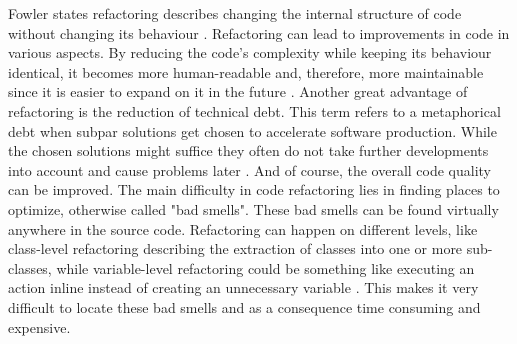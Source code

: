 Fowler states refactoring describes changing the internal structure of code without changing its behaviour \cite{fowler2018refactoring}.
Refactoring can lead to improvements in code in various aspects. By reducing the code's complexity while keeping its behaviour identical, it becomes more human-readable and, therefore, more maintainable since it is easier to expand on it in the future \cite{kaur2016analysis}.
Another great advantage of refactoring is the reduction of technical debt. This term refers to a metaphorical debt when subpar solutions get chosen to accelerate software production. While the chosen solutions might suffice they often do not take further developments into account and cause problems later \cite{techdebt}.
And of course, the overall code quality can be improved.
The main difficulty in code refactoring lies in finding places to optimize, otherwise called "bad smells". These bad smells can be found virtually anywhere in the source code. Refactoring can happen on different levels, like class-level refactoring describing the extraction of classes into one or more sub-classes, while variable-level refactoring could be something like executing an action inline instead of creating an unnecessary variable \cite{aniche2020effectiveness}. This makes it very difficult to locate these bad smells and as a consequence time consuming and expensive.